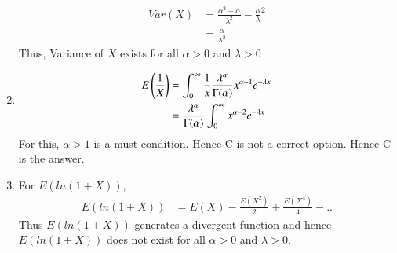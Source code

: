\documentclass[journal,12pt,twocolumn]{IEEEtran}
\theoremstyle{remark}
\begin{document}
\begin{enumerate}
{\begin{align}
{Var}(X) &= \frac{{\alpha}^2+{\alpha}}{{\lambda}^2} - {\frac{{\alpha}}{{\lambda}}} ^2 \\
&= \frac{{\alpha}}{{\lambda}^2}
\end{align}
Thus, Variance of $X$ exists for all $\alpha > 0$ and $\lambda > 0$
}
\item {
\begin{align}
E\left(\frac{1}{X}\right)&= \int_{0}^{\infty} \frac{1}{x}\frac{\lambda^{\alpha}}{\Gamma(\alpha)}x^{\alpha - 1} e^{-\lambda x}\\
&= \frac{\lambda^{\alpha}}{\Gamma(\alpha)} \int_{0}^{\infty}x^{\alpha-2} e^{-\lambda x}
\end{align}
For this, $\alpha >1$ is a must condition. Hence C is not a correct option.
Hence C is the answer.
}
\item
{
For $E(ln(1+X))$,
\begin{align}
E(ln(1+X))&=E(X)-\frac{E(X^2)}{2}+\frac{E(X^4)}{4}-..
\end{align}
Thus $E(ln(1+X))$ generates a divergent function and hence $E(ln(1+X))$ does not exist for all $\alpha > 0$ and $ \lambda > 0$.
}
\end{enumerate}
\end{document}
